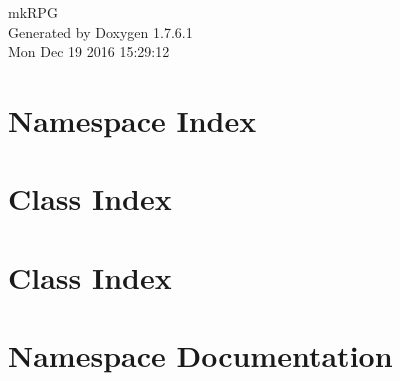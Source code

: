 \documentclass[a4paper]{book}
\begin{document}
\hypersetup{pageanchor=false,citecolor=blue}
\begin{titlepage}
\vspace*{7cm}
\begin{center}
{\Large mk\-R\-P\-G }\\
\vspace*{1cm}
{\large \-Generated by Doxygen 1.7.6.1}\\
\vspace*{0.5cm}
{\small Mon Dec 19 2016 15:29:12}\\
\end{center}
\end{titlepage}
\clearemptydoublepage
{}
\tableofcontents
\clearemptydoublepage
{}
\hypersetup{pageanchor=true,citecolor=blue}
\chapter{\-Namespace \-Index}

\chapter{\-Class \-Index}

\chapter{\-Class \-Index}

\chapter{\-Namespace \-Documentation}









\end{document}
